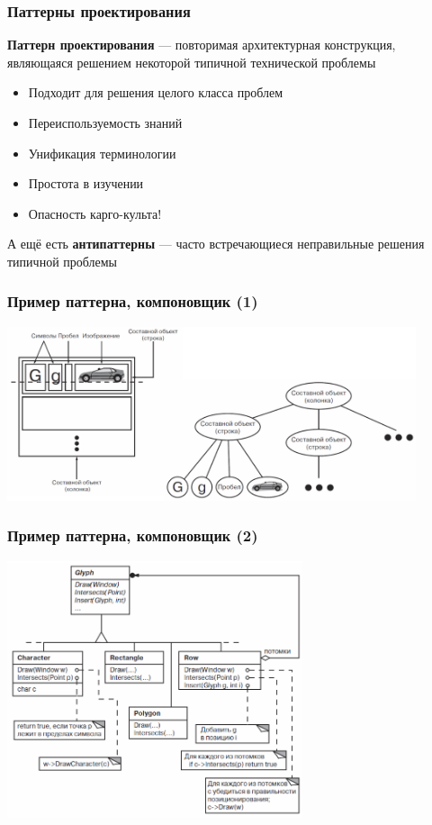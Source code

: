 \documentclass[xetex,mathserif,serif]{beamer}
\begin{document}
	\begin{frame}
		\frametitle{Паттерны проектирования}
		\textbf{Паттерн проектирования} --- повторимая архитектурная конструкция, являющаяся решением некоторой типичной технической проблемы
		\begin{itemize}
			\item Подходит для решения целого класса проблем
			\item Переиспользуемость знаний
			\item Унификация терминологии
			\item Простота в изучении
			\item Опасность карго-культа!
		\end{itemize}
		А ещё есть \textbf{антипаттерны} --- часто встречающиеся неправильные решения типичной проблемы
	\end{frame}

	\begin{frame}
		\frametitle{Пример паттерна, компоновщик (1)}
		\begin{center}
			\includegraphics[width=0.9\textwidth]{documentComposition.png}
		\end{center}
	\end{frame}

	\begin{frame}
		\frametitle{Пример паттерна, компоновщик (2)}
		\begin{center}
			\includegraphics[width=0.65\textwidth]{glyphs.png}
		\end{center}
	\end{frame}
\end{document}

